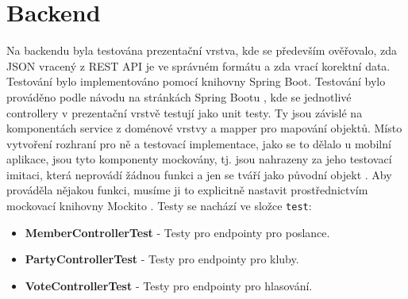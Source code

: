 \section{Backend}
Na backendu byla testována prezentační vrstva, kde se především ověřovalo, zda JSON vracený z REST API je ve správném formátu a zda vrací korektní data. Testování bylo implementováno pomocí knihovny Spring Boot. Testování bylo prováděno podle návodu na stránkách Spring Bootu \cite{spring-boot-testing}, kde se jednotlivé controllery v prezentační vrstvě testují jako unit testy. Ty jsou závislé na komponentách service z doménové vrstvy a mapper pro mapování objektů. Místo vytvoření rozhraní pro ně a testovací implementace, jako se to dělalo u mobilní aplikace, jsou tyto komponenty mockovány, tj. jsou nahrazeny za jeho testovací imitaci, která neprovádí žádnou funkci a jen se tváří jako původní objekt \cite{mocking}. Aby prováděla nějakou funkci, musíme ji to explicitně nastavit prostřednictvím mockovací knihovny Mockito \cite{mockito}. Testy se nachází ve složce \texttt{test}:

\begin{itemize}
	\item \textbf{MemberControllerTest} - Testy pro endpointy pro poslance.
	\item \textbf{PartyControllerTest} - Testy pro endpointy pro kluby.
	\item \textbf{VoteControllerTest} - Testy pro endpointy pro hlasování.
\end{itemize}






